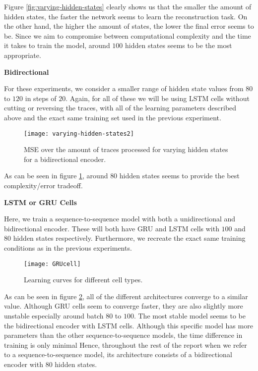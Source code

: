 Figure \ref{fig:varying-hidden-states} clearly shows us that the smaller the amount of hidden states, the faster the network seems to learn the reconstruction task.
On the other hand, the higher the amount of states, the lower the final error seems to be.
Since we aim to compromise between computational complexity and the time it takes to train the model, around $100$ hidden states seems to be the most appropriate.

\newpage

\noindent
\textbf{Bidirectional}

For these experiments, we consider a smaller range of hidden state values from $80$ to $120$ in steps of $20$.
Again, for all of these we will be using LSTM cells without cutting or reversing the traces, with all of the learning parameters described above and the exact same training set used in the previous experiment.

\begin{figure}[ht]
  \centering
  \texttt{[image: varying-hidden-states2]}
  \caption{MSE over the amount of traces processed for varying hidden states for a bidirectional encoder.}
  \label{fig:varying-hidden-states2}
\end{figure}

\noindent
As can be seen in figure \ref{fig:varying-hidden-states2}, around $80$ hidden states seems to provide the best complexity/error tradeoff.

\newpage

\noindent
\textbf{LSTM or GRU Cells}

Here, we train a sequence-to-sequence model with both a unidirectional and bidirectional encoder.
These will both have GRU and LSTM cells with $100$ and $80$ hidden states respectively.
Furthermore, we recreate the exact same training conditions as in the previous experiments.

\begin{figure}[ht]
  \centering
  \texttt{[image: GRUcell]}
  \caption{Learning curves for different cell types.}
  \label{fig:varying-cell-type}
\end{figure}

As can be seen in figure \ref{fig:varying-cell-type}, all of the different architectures converge to a similar value.
Although GRU cells seem to converge faster, they are also slightly more unstable especially around batch $80$ to $100$.
The most stable model seems to be the bidirectional encoder with LSTM cells.
Although this specific model has more parameters than the other sequence-to-sequence models, the time difference in training is only minimal
Hence, throughout the rest of the report when we refer to a sequence-to-sequence model, its architecture consists of a bidirectional encoder with $80$ hidden states.

